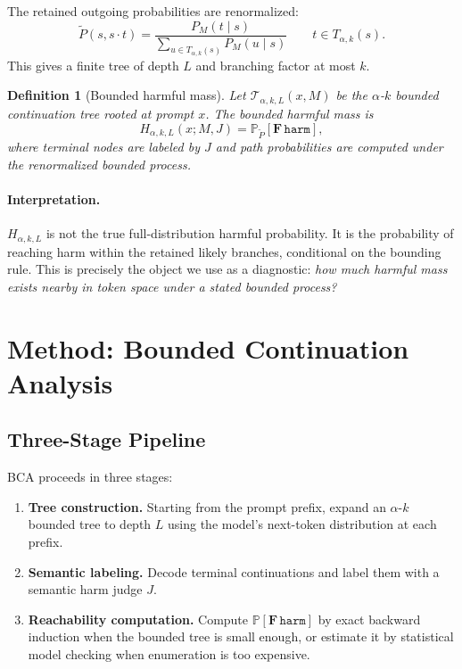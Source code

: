 \documentclass[11pt]{article}
\newtheorem{definition}{Definition}
\newcommand{\Prob}{\mathbb{P}}
\newcommand{\calT}{\mathcal{T}}
\newcommand{\harm}{\texttt{harm}}
\newcommand{\BCA}{\textsc{BCA}}
\begin{document}
The retained outgoing probabilities are renormalized:
\[
  \widetilde P(s,s\cdot t)
  =
  \frac{P_M(t\mid s)}
       {\sum_{u\in T_{\alpha,k}(s)}P_M(u\mid s)}
  \qquad t\in T_{\alpha,k}(s).
\]
This gives a finite tree of depth $L$ and branching factor at most $k$.

\begin{definition}[Bounded harmful mass]
\label{def:bounded-mass}
Let $\calT_{\alpha,k,L}(x,M)$ be the $\alpha$-$k$ bounded continuation tree rooted at prompt $x$.  The bounded harmful mass is
\[
  H_{\alpha,k,L}(x;M,J)
  =
  \Prob_{\widetilde P}
  \left[\mathbf{F}\,\harm\right],
\]
where terminal nodes are labeled by $J$ and path probabilities are computed under the renormalized bounded process.
\end{definition}

\paragraph{Interpretation.}
$H_{\alpha,k,L}$ is not the true full-distribution harmful probability.  It is the probability of reaching harm within the retained likely branches, conditional on the bounding rule.  This is precisely the object we use as a diagnostic: \emph{how much harmful mass exists nearby in token space under a stated bounded process?}

\section{Method: Bounded Continuation Analysis}
\label{sec:method-bca}

\subsection{Three-Stage Pipeline}

\BCA{} proceeds in three stages:

\begin{enumerate}[leftmargin=*,itemsep=2pt]
  \item \textbf{Tree construction.} Starting from the prompt prefix, expand an $\alpha$-$k$ bounded tree to depth $L$ using the model's next-token distribution at each prefix.
  \item \textbf{Semantic labeling.} Decode terminal continuations and label them with a semantic harm judge $J$.
  \item \textbf{Reachability computation.} Compute $\Prob[\mathbf{F}\,\harm]$ by exact backward induction when the bounded tree is small enough, or estimate it by statistical model checking when enumeration is too expensive.
\end{enumerate}
\end{document}
